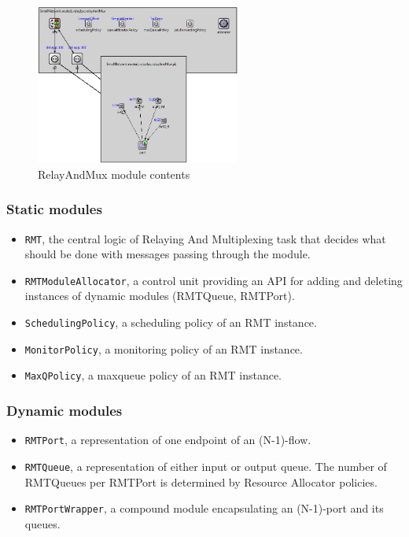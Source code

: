            \begin{figure}[H]
                \begin{center}
                    \includegraphics[width=0.6\textwidth]{fig/impl_rinasim-rmt.png}
                  \caption{RelayAndMux module contents}
                  \label{fig:rinasim:rmt}
                \end{center}
            \end{figure}

            \subsubsection{Static modules}
            \begin{itemize}
                \item \texttt{RMT}, the central logic of Relaying And Multiplexing task that decides what should be done with messages passing through the module.
                \item \texttt{RMTModuleAllocator}, a control unit providing an API for adding and deleting instances of dynamic modules (RMTQueue, RMTPort).
                \item \texttt{SchedulingPolicy}, a scheduling policy of an RMT instance.
                \item \texttt{MonitorPolicy}, a monitoring policy of an RMT instance.
                \item \texttt{MaxQPolicy}, a maxqueue policy of an RMT instance.
            \end{itemize}

            \subsubsection{Dynamic modules}
            \begin{itemize}
                \item \texttt{RMTPort}, a representation of one endpoint of an (N-1)-flow.
                \item \texttt{RMTQueue}, a representation of either input or output queue. The number of RMTQueues per RMTPort is determined by Resource Allocator policies.
                \item \texttt{RMTPortWrapper}, a compound module encapsulating an (N-1)-port and its queues.
            \end{itemize}

